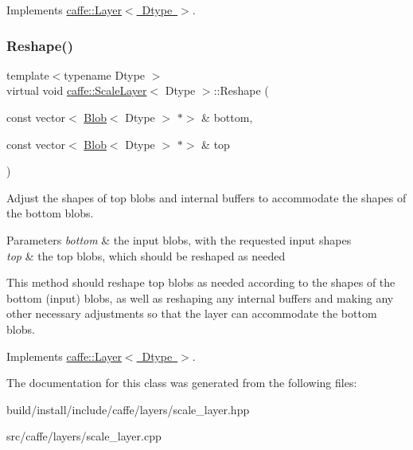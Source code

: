 Implements \mbox{\hyperlink{classcaffe_1_1_layer_a7fe981e8af8d93d587acf2a952be563d}{caffe\+::\+Layer$<$ Dtype $>$}}.

\mbox{\label{classcaffe_1_1_scale_layer_a40101bfc91fea909fdc9047c3618d07d}} 
\subsubsection{\texorpdfstring{Reshape()}{Reshape()}\hspace{0.1cm}{\footnotesize\ttfamily [2/2]}}
{\footnotesize\ttfamily template$<$typename Dtype $>$ \\
virtual void \mbox{\hyperlink{classcaffe_1_1_scale_layer}{caffe\+::\+Scale\+Layer}}$<$ Dtype $>$\+::Reshape (\begin{DoxyParamCaption}\item[{const vector$<$ \mbox{\hyperlink{classcaffe_1_1_blob}{Blob}}$<$ Dtype $>$ $\ast$$>$ \&}]{bottom,  }\item[{const vector$<$ \mbox{\hyperlink{classcaffe_1_1_blob}{Blob}}$<$ Dtype $>$ $\ast$$>$ \&}]{top }\end{DoxyParamCaption})\hspace{0.3cm}{\ttfamily [virtual]}}



Adjust the shapes of top blobs and internal buffers to accommodate the shapes of the bottom blobs. 


\begin{DoxyParams}{Parameters}
{\em bottom} & the input blobs, with the requested input shapes \\
\hline
{\em top} & the top blobs, which should be reshaped as needed\\
\hline
\end{DoxyParams}
This method should reshape top blobs as needed according to the shapes of the bottom (input) blobs, as well as reshaping any internal buffers and making any other necessary adjustments so that the layer can accommodate the bottom blobs. 

Implements \mbox{\hyperlink{classcaffe_1_1_layer_a7fe981e8af8d93d587acf2a952be563d}{caffe\+::\+Layer$<$ Dtype $>$}}.



The documentation for this class was generated from the following files\+:\begin{DoxyCompactItemize}
\item 
build/install/include/caffe/layers/scale\+\_\+layer.\+hpp\item 
src/caffe/layers/scale\+\_\+layer.\+cpp\end{DoxyCompactItemize}

